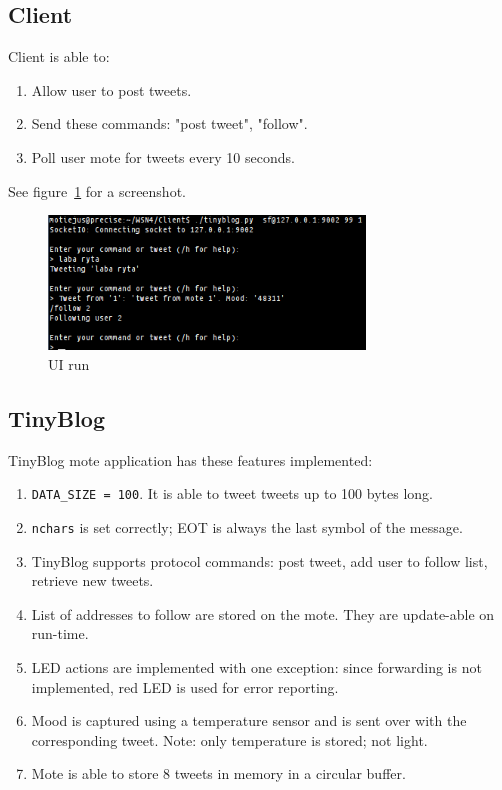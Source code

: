 \documentclass[english,11pt]{article}
\numberwithin{equation}{section}
\begin{document}
\subsection{Client}

Client is able to:
\begin{enumerate}
    \item Allow user to post tweets.
    \item Send these commands: "post tweet", "follow".
    \item Poll user mote for tweets every 10 seconds.
\end{enumerate}

See figure~\ref{fig:ui_run} for a screenshot.
\begin{figure}
    \centering
    \includegraphics[width=0.75\textwidth]{ui_run.png}
    \caption{UI run}
    \label{fig:ui_run}
\end{figure}

\subsection{TinyBlog}

TinyBlog mote application has these features implemented:
\begin{enumerate}
    \item \texttt{DATA\_SIZE = 100}. It is able to tweet tweets up to 100 bytes
        long.

    \item \texttt{nchars} is set correctly; EOT is always the last symbol of the
        message.
    \item TinyBlog supports protocol commands: post tweet, add user to follow
        list, retrieve new tweets.
    \item List of addresses to follow are stored on the mote. They are
        update-able on run-time.
    \item LED actions are implemented with one exception: since forwarding is
        not implemented, red LED is used for error reporting.
    \item Mood is captured using a temperature sensor and is sent over with the
        corresponding tweet. Note: only temperature is stored; not light.
    \item Mote is able to store 8 tweets in memory in a circular buffer.
\end{enumerate}
\end{document}
